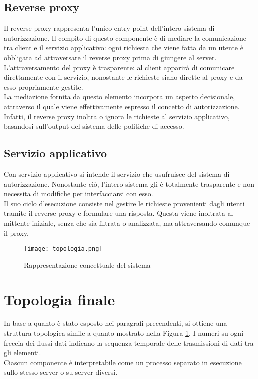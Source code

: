 \subsection{Reverse proxy}
Il reverse proxy rappresenta l'unico entry-point dell'intero sistema di autorizzazione. Il compito di questo componente è di
mediare la comunicazione tra client e il servizio applicativo: ogni richiesta che viene fatta da un utente è obbligata ad attraversare 
il reverse proxy prima di giungere al server. 
\\ L'attraversamento del proxy è trasparente: al client apparirà di comunicare direttamente con il servizio, nonostante le richieste siano dirette al proxy e da esso propriamente gestite. 
\\ La mediazione fornita da questo elemento incorpora un aspetto decisionale, attraverso il quale viene effettivamente espresso il concetto di autorizzazione. 
Infatti, il reverse proxy inoltra o ignora le richieste al servizio applicativo, basandosi sull'output del sistema delle politiche di accesso.  
 

\subsection{Servizio applicativo} \label{serv_server}
Con servizio applicativo si intende il servizio che usufruisce del sistema di autorizzazione. 
Nonostante ciò, l'intero sistema gli è totalmente trasparente e non necessita di modifiche per interfacciarsi con esso.
\\Il suo ciclo d'esecuzione consiste nel gestire 
le richieste provenienti dagli utenti tramite
 il reverse proxy e formulare una risposta.
Questa viene inoltrata al mittente iniziale, senza che sia filtrata o analizzata, ma attraversando comunque il proxy.

\begin{figure}[h]
    \texttt{[image: topologia.png]}
    \centering
    \caption{Rappresentazione concettuale del sistema}
    \label{topologia}
\end{figure}

\section{Topologia finale}
In base a quanto è stato esposto nei paragrafi precendenti, si ottiene una struttura topologica simile a quanto mostrato nella Figura \ref{topologia}. 
I numeri su ogni freccia dei flussi dati indicano la sequenza temporale delle trasmissioni di dati tra gli elementi. 
\\Ciascun componente è interpretabile come un processo separato in esecuzione sullo stesso server o su server diversi. 
